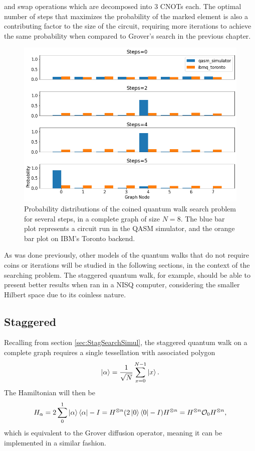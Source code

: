 \documentclass[../../dissertation.tex]{subfiles}
\begin{document}
and swap operations which are decomposed into $3$ CNOTs each. The optimal
number of steps that maximizes the probability of the marked element is also a
contributing factor to the size of the circuit, requiring more iterations to
achieve the same probability when compared to Grover's search in the previous
chapter. 
\begin{figure}[!h]
	\centering
	\includegraphics[scale=0.40]{img/Qiskit/CoinedQuantumWalk/Search/CoinedQiskitSearch_N3_M4_S0245}
	\caption{Probability distributions of the coined quantum walk search problem for several steps, in a complete graph of size $N=8$. The blue bar plot represents a circuit run in the QASM simulator, and the orange bar plot on IBM's Toronto backend.} 
	\label{fig:coinedSearchQiskitDist}
\end{figure}\par

As was done previously, other models of the quantum walks that do
not require coins or iterations will be studied in the following sections, in
the context of the searching problem. The staggered quantum walk, for example,
should be able to present better results when ran in a NISQ computer, considering the
smaller Hilbert space due to its coinless nature.

\subsection{Staggered}
Recalling from section \ref{sec:StagSearchSimul}, the staggered quantum walk on
a complete graph requires a single tessellation with associated polygon
\begin{equation}
	\ket{\alpha} = \frac{1}{\sqrt{N}} \sum_{x=0}^{N-1} \ket{x}.
\end{equation}
The Hamiltonian will then be 
\begin{equation}
	H_\alpha = 2\sum_0^1\ket{\alpha}\bra{\alpha} - I = H^{\otimes n} (2\ket{0}\bra{0} - I) H^{\otimes n} = H^{\otimes n} \mathcal{O}_0 H^{\otimes n},
\end{equation}
which is equivalent to the Grover diffusion operator, meaning it can be
implemented in a similar fashion. \par
\end{document}
